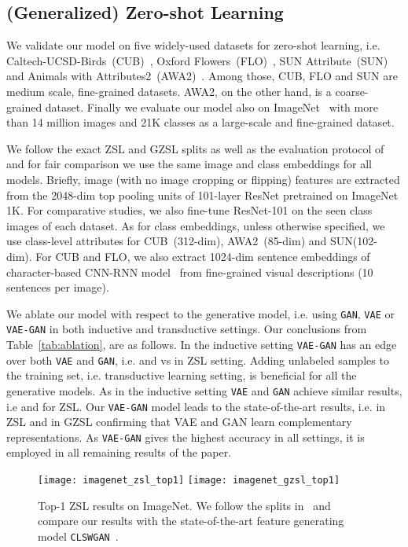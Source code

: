 \documentclass[10pt,twocolumn,letterpaper]{article}
\newcommand{\myparagraph}[1]{\vspace{5pt}\noindent{\bf #1}}
\begin{document}
\subsection{(Generalized) Zero-shot Learning}
We validate our model on five widely-used datasets for zero-shot learning, i.e. Caltech-UCSD-Birds~(CUB)~\cite{CaltechUCSDBirdsDataset}, Oxford Flowers~(FLO)~\cite{OxfordFlowersDataset}, SUN Attribute~(SUN)~\cite{PH12} and Animals with Attributes2~(AWA2)~\cite{xian2018zero}. Among those, CUB, FLO and SUN are medium scale, fine-grained datasets. AWA2, on the other hand, is a coarse-grained dataset. Finally we evaluate our model also on ImageNet~\cite{imagenet} with more than 14 million images and 21K classes as a large-scale and fine-grained dataset. 

We follow the exact ZSL and GZSL splits as well as the evaluation protocol of~\cite{xian2018zero} and for fair comparison we use the same image and class embeddings for all models. Briefly, image (with no image cropping or flipping) features are extracted from the 2048-dim top pooling units of 101-layer ResNet pretrained  on ImageNet 1K. For comparative studies, we also fine-tune ResNet-101 on the seen class images of each dataset. As for class embeddings, unless otherwise specified, we use class-level attributes for CUB~(312-dim), AWA2~(85-dim) and SUN(102-dim). For CUB and FLO, we also extract 1024-dim sentence embeddings of character-based CNN-RNN model~\cite{RALS16} from fine-grained visual descriptions (10 sentences per image). 

\myparagraph{Ablation study.} We ablate our model with respect to the generative model, i.e. using \texttt{GAN}, \texttt{VAE} or \texttt{VAE-GAN} in both inductive and transductive settings. Our conclusions from Table~\ref{tab:ablation}, are as follows. In the inductive setting \texttt{VAE-GAN} has an edge over both \texttt{VAE} and \texttt{GAN}, i.e.   and   vs  in ZSL setting. Adding unlabeled samples to the training set, i.e. transductive learning setting, is beneficial for all the generative models. As in the inductive setting \texttt{VAE} and \texttt{GAN} achieve similar results, i.e  and  for ZSL. Our \texttt{VAE-GAN} model leads to the state-of-the-art results, i.e.  in ZSL and  in GZSL confirming that VAE and GAN learn complementary representations. As \texttt{VAE-GAN} gives the highest accuracy in all settings, it is employed in all remaining results of the paper.

\begin{figure}[t]
	\centering
		\texttt{[image: imagenet\_zsl\_top1]}
        \texttt{[image: imagenet\_gzsl\_top1]}
	\caption{Top-1 ZSL results on ImageNet. We follow the splits in~\cite{xian2018zero} and compare our results with the state-of-the-art feature generating model \texttt{CLSWGAN}~\cite{XLSA18}.}
	\label{fig:imagenet}
\end{figure}
\end{document}

